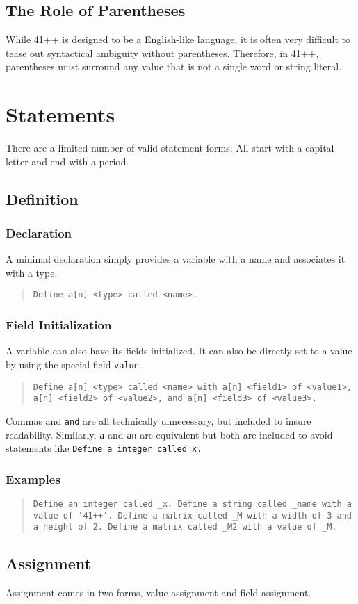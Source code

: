 \documentclass{article}
\newcommand{\code}[1]{\texttt{#1}}
\newcommand{\codeblock}[1]{\begin{quote}\code{#1}\end{quote}}
\begin{document}
\subsection{The Role of Parentheses}
While 41++ is designed to be a English-like language, it is often very difficult to tease out syntactical ambiguity without parentheses. Therefore, in 41++, parentheses must surround any value that is not a single word or string literal.
\section{Statements}
There are a limited number of valid statement forms. All start with a capital letter and end with a period.
\subsection{Definition}
\subsubsection{Declaration}
A minimal declaration simply provides a variable with a name and associates it with a type.

\codeblock{Define a[n] <type> called <name>.}

\subsubsection{Field Initialization}
A variable can also have its fields initialized. It can also be directly set to a value by using the special field \code{value}.

\codeblock{Define a[n] <type> called <name> with a[n] <field1> of <value1>, a[n] <field2> of <value2>, and a[n] <field3> of <value3>.}

\noindent Commas and \code{and} are all technically unnecessary, but included to insure readability. Similarly, \code{a} and \code{an} are equivalent but both are included to avoid statements like \code{Define a integer called x.}
\subsubsection{Examples}

\codeblock{Define an integer called \_{}x. Define a string called \_{}name with a value of '41++'. Define a matrix called \_{}M with a width of 3 and a height of 2. Define a matrix called \_{}M2 with a value of \_{}M.}

\subsection{Assignment}
Assignment comes in two forms, value assignment and field assignment.
\end{document}
